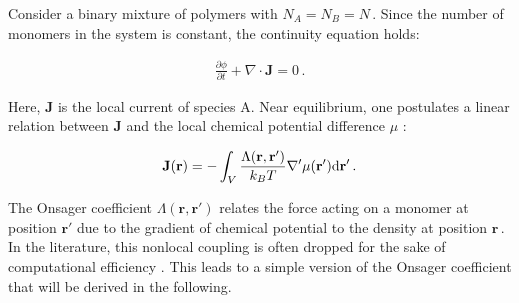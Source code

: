 \documentclass[bachelor,       %
               twoside,        %
               BCOR10mm,       %
                ngerman,english  %
               ]{GAUBM}
\begin{document}
Consider a binary mixture of polymers with $N_A=N_B=N\,$. Since the number of monomers in the system is constant, the continuity equation holds:

\begin{align}
  \frac{\partial\phi}{\partial t}+\nabla\cdot\mathbf{J}=0\,.
  \label{eq:conti}
\end{align}

Here, $\mathbf{J}$ is the local current of species A. Near equilibrium, one postulates a linear relation between $\mathbf J$ and the local chemical potential difference $\mu$ \cite{deGennes80}:


\begin{align}
    \mathbf J(\mathbf{r})=-\int_V\frac{\Lambda(\mathbf{r}, \mathbf{r'})}{k_BT}\nabla '\mu(\mathbf{r'})\text d \mathbf{r'}\,.
    \label{eq:current}
\end{align}

The Onsager coefficient $\Lambda(\mathbf{r}, \mathbf{r'})$ relates the force acting on a monomer at position $\mathbf{r'}$ due to the gradient of chemical potential to the density at position $\mathbf{r}\,$. In the literature, this nonlocal coupling is often dropped for the sake of computational efficiency \cite{Fraaje97,deGennes80,Binder83}. This leads to a simple version of the Onsager coefficient that will be derived in the following. 






\end{document}
